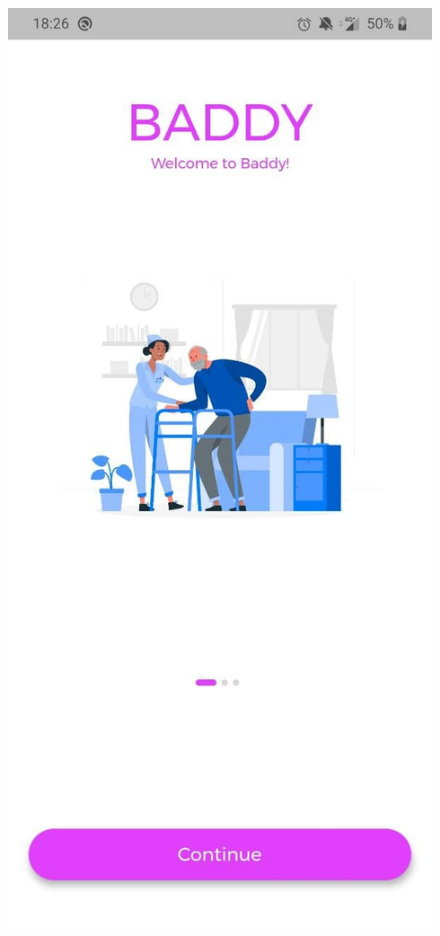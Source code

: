 \documentclass[../../dd.tex]{subfiles}
\begin{document}
    \begin{figure}[H]
        \centering
        \includegraphics[height=.4\textheight]{../../assets/screens/splash1.jpg}

\end{figure}
\end{document}
